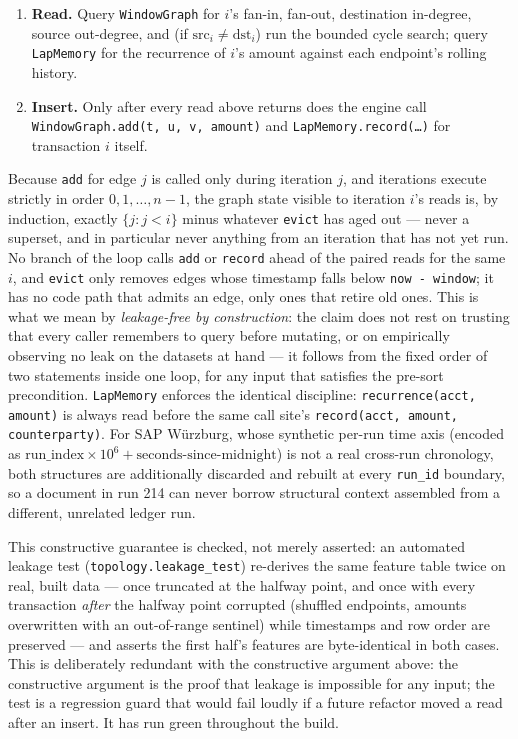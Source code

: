 \begin{enumerate}
  \item \textbf{Read.} Query \texttt{WindowGraph} for $i$'s fan-in, fan-out,
  destination in-degree, source out-degree, and (if $\mathrm{src}_i \neq
  \mathrm{dst}_i$) run the bounded cycle search; query \texttt{LapMemory} for
  the recurrence of $i$'s amount against each endpoint's rolling history.
  \item \textbf{Insert.} Only after every read above returns does the engine
  call \texttt{WindowGraph.add(t, u, v, amount)} and
  \texttt{LapMemory.record(\ldots)} for transaction $i$ itself.
\end{enumerate}

Because \texttt{add} for edge $j$ is called only during iteration $j$, and
iterations execute strictly in order $0, 1, \ldots, n-1$, the graph state
visible to iteration $i$'s reads is, by induction, exactly $\{j : j < i\}$
minus whatever \texttt{evict} has aged out — never a superset, and in
particular never anything from an iteration that has not yet run. No branch
of the loop calls \texttt{add} or \texttt{record} ahead of the paired reads
for the same $i$, and \texttt{evict} only removes edges whose timestamp falls
below \texttt{now - window}; it has no code path that admits an edge, only
ones that retire old ones. This is what we mean by \emph{leakage-free by
construction}: the claim does not rest on trusting that every caller remembers
to query before mutating, or on empirically observing no leak on the datasets
at hand — it follows from the fixed order of two statements inside one loop,
for any input that satisfies the pre-sort precondition. \texttt{LapMemory}
enforces the identical discipline: \texttt{recurrence(acct, amount)} is
always read before the same call site's \texttt{record(acct, amount,
counterparty)}. For SAP Würzburg, whose synthetic per-run time axis (encoded
as $\mathrm{run\_index}\times 10^{6} + \text{seconds-since-midnight}$) is not
a real cross-run chronology, both structures are additionally discarded and
rebuilt at every \texttt{run\_id} boundary, so a document in run 214 can never
borrow structural context assembled from a different, unrelated ledger run.

This constructive guarantee is checked, not merely asserted: an automated
leakage test (\texttt{topology.leakage\_test}) re-derives the same feature
table twice on real, built data — once truncated at the halfway point, and
once with every transaction \emph{after} the halfway point corrupted (shuffled
endpoints, amounts overwritten with an out-of-range sentinel) while
timestamps and row order are preserved — and asserts the first half's
features are byte-identical in both cases. This is deliberately redundant
with the constructive argument above: the constructive argument is the proof
that leakage is impossible for any input; the test is a regression guard that
would fail loudly if a future refactor moved a read after an insert. It has
run green throughout the build.

